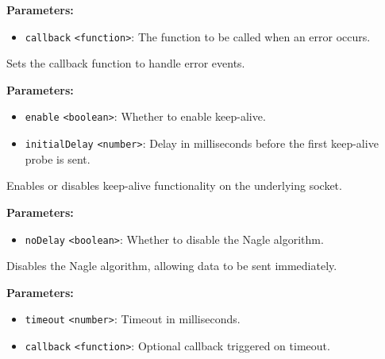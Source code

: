 \documentclass[12pt,a4paper]{article}
\begin{document}
\noindent \textbf{Parameters:}
\begin{itemize}
  \item \texttt{callback} \texttt{<function>}: The function to be called when an error occurs.
\end{itemize}

\noindent Sets the callback function to handle error events.

\vspace{5mm}
\noindent {}


\noindent \textbf{Parameters:}
\begin{itemize}
  \item \texttt{enable} \texttt{<boolean>}: Whether to enable keep-alive.
  \item \texttt{initialDelay} \texttt{<number>}: Delay in milliseconds before the first keep-alive probe is sent.
\end{itemize}

\noindent Enables or disables keep-alive functionality on the underlying socket.

\vspace{5mm}
\noindent {}


\noindent \textbf{Parameters:}
\begin{itemize}
  \item \texttt{noDelay} \texttt{<boolean>}: Whether to disable the Nagle algorithm.
\end{itemize}

\noindent Disables the Nagle algorithm, allowing data to be sent immediately.

\vspace{5mm}
\noindent {}


\noindent \textbf{Parameters:}
\begin{itemize}
  \item \texttt{timeout} \texttt{<number>}: Timeout in milliseconds.
  \item \texttt{callback} \texttt{<function>}: Optional callback triggered on timeout.
\end{itemize}
\end{document}
